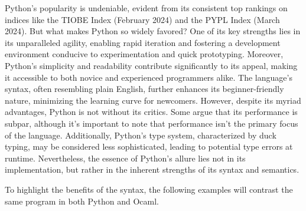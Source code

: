\documentclass{l4proj}
\begin{document}


Python's popularity is undeniable, evident from its consistent top rankings on indices like the TIOBE Index (February 2024) and the PYPL Index (March 2024).
But what makes Python so widely favored? One of its key strengths lies in its unparalleled agility, enabling rapid iteration and fostering a development environment conducive to experimentation and quick prototyping.
Moreover, Python's simplicity and readability contribute significantly to its appeal, making it accessible to both novice and experienced programmers alike.
The language's syntax, often resembling plain English, further enhances its beginner-friendly nature, minimizing the learning curve for newcomers.
However, despite its myriad advantages, Python is not without its critics.
Some argue that its performance is subpar, although it's important to note that performance isn't the primary focus of the language.
Additionally, Python's type system, characterized by duck typing, may be considered less sophisticated, leading to potential type errors at runtime.
Nevertheless, the essence of Python's allure lies not in its implementation, but rather in the inherent strengths of its syntax and semantics.

To highlight the benefits of the syntax, the following examples will contrast the same program in both Python and Ocaml.


\end{document}
